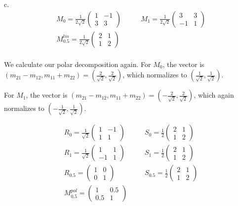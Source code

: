 \documentclass{letter}
\begin{document}
c. 
\begin{align*} 
& M_0 = 
\frac{1}{2\sqrt{2}}
\begin{pmatrix}
1 & -1 \\
3 & 3 
\end{pmatrix}
\quad \quad 
& M_1 = 
\frac{1}{2\sqrt{2}}
\begin{pmatrix} 
3 & 3  \\ 
-1  & 1
\end{pmatrix} \\
& M_{0.5}^{lin} = 
\frac{1}{2\sqrt{2}}
\begin{pmatrix}
2 & 1\\
1 & 2
\end{pmatrix} \\
\end{align*}

We calculate our polar decomposition again. For $M_0$, the vector is $(m_{21} - m_{12}, m_{11} + m_{22}) = (\frac{2}{\sqrt{2}}, \frac{2}{\sqrt{2}})$, which normalizes to $(\frac{1}{\sqrt{2}}, \frac{1}{\sqrt{2}})$. 

For $M_1$, the vector is $(m_{21} - m_{12}, m_{11} + m_{22}) = (-\frac{2}{\sqrt{2}}, \frac{2}{\sqrt{2}})$, which again normalizes to $(-\frac{1}{\sqrt{2}}, \frac{1}{\sqrt{2}})$.

\begin{align*}
& R_0 = 
\frac{1}{\sqrt{2}}
\begin{pmatrix}
1 & -1 \\ 
1 & 1
\end{pmatrix}
\quad \quad 
& S_0 = 
\frac{1}{2}
\begin{pmatrix}
2 & 1 \\
1 & 2
\end{pmatrix} \\
& R_1 = 
\frac{1}{\sqrt{2}}
\begin{pmatrix} 
1 & 1 \\
-1 & 1
\end{pmatrix}
\quad \quad 
& S_1 = 
\frac{1}{2}
\begin{pmatrix}
2 & 1 \\
1 & 2
\end{pmatrix} \\
& R_{0.5} =  
\begin{pmatrix}
1 & 0 \\
0 & 1
\end{pmatrix}
& S_{0.5} = 
\frac{1}{2}
\begin{pmatrix}
2 & 1 \\
1 & 2
\end{pmatrix} \\
& M_{0.5}^{pol} =
\begin{pmatrix}
1 & 0.5 \\
0.5 & 1
\end{pmatrix} 
\end{align*}
\end{document}
